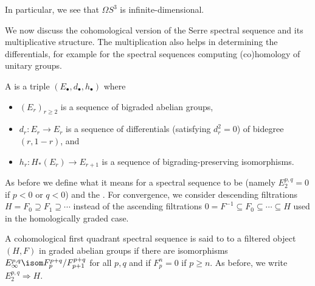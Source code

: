 \begin{example}
\begin{center}
	\end{center}
	In particular, we see that $\Omega S^3$ is infinite-dimensional.
\end{example}

We now discuss the cohomological version of the Serre spectral sequence and its multiplicative structure.
The multiplication also helps in determining the differentials, for example for the spectral sequences computing (co)homology of unitary groups.
\begin{definition}
	A 	is a triple $(E_\bullet, d_\bullet, h_\bullet)$ where
	\begin{itemize}
		\item $(E_r)_{r \geq 2}$ is a sequence of bigraded abelian groups,
		\item $d_r\colon E_r \to E_r$ is a sequence of differentials (satisfying $d_r^2 = 0$) of bidegree $(r, 1 - r)$, and
		\item $h_r\colon H_*(E_r) \to E_{r + 1}$ is a sequence of bigrading-preserving isomorphisms.
	\end{itemize}
\end{definition}
As before we define what it means for a spectral sequence to be  (namely $E^{p, q}_2 = 0$ if $p < 0$ or $q < 0$) and the .
For convergence, we consider descending filtrations $H = F_0 \supseteq F_1 \supseteq \cdots$ instead of the ascending filtrations $0 = F^{-1} \subseteq F_0 \subseteq \cdots \subseteq H$ used in the homologically graded case.
\begin{definition}
	A cohomological first quadrant spectral sequence is said to  to a filtered object $(H, F)$ in graded abelian groups if there are isomorphisms $E^{p, q}_\infty \isom F^{p + q}_p / F^{p + q}_{p + 1}$ for all $p, q$ and if $F^n_p = 0$ if $p \geq n$.
	As before, we write $E^{p, q}_2 \Rightarrow H$.
\end{definition}
